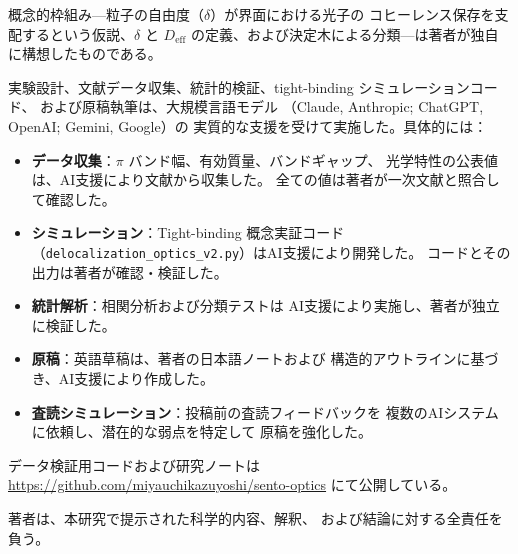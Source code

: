 \documentclass[twocolumn,showpacs,preprintnumbers,amsmath,amssymb,prb]{revtex4-2}
\begin{document}
概念的枠組み---粒子の自由度（$\delta$）が界面における光子の
コヒーレンス保存を支配するという仮説、$\delta$ と $D_\mathrm{eff}$
の定義、および決定木による分類---は著者が独自に構想したものである。

実験設計、文献データ収集、統計的検証、tight-binding シミュレーションコード、
および原稿執筆は、大規模言語モデル
（Claude, Anthropic; ChatGPT, OpenAI; Gemini, Google）の
実質的な支援を受けて実施した。具体的には：

\begin{itemize}
  \item \textbf{データ収集}：$\pi$ バンド幅、有効質量、バンドギャップ、
    光学特性の公表値は、AI支援により文献から収集した。
    全ての値は著者が一次文献と照合して確認した。
  \item \textbf{シミュレーション}：Tight-binding 概念実証コード
    （\texttt{delocalization\_optics\_v2.py}）はAI支援により開発した。
    コードとその出力は著者が確認・検証した。
  \item \textbf{統計解析}：相関分析および分類テストは
    AI支援により実施し、著者が独立に検証した。
  \item \textbf{原稿}：英語草稿は、著者の日本語ノートおよび
    構造的アウトラインに基づき、AI支援により作成した。
  \item \textbf{査読シミュレーション}：投稿前の査読フィードバックを
    複数のAIシステムに依頼し、潜在的な弱点を特定して
    原稿を強化した。
\end{itemize}

\noindent データ検証用コードおよび研究ノートは
\url{https://github.com/miyauchikazuyoshi/sento-optics}
にて公開している。

\noindent 著者は、本研究で提示された科学的内容、解釈、
および結論に対する全責任を負う。


\end{document}
